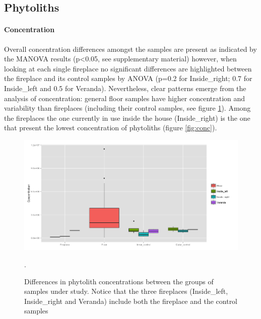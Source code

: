 \documentclass[authoryear,preprint,review,12pt]{elsarticle}
\begin{document}
\subsection{Phytoliths}
\label{subsec:3.1}
\paragraph{Concentration}
Overall concentration differences amongst the samples are present as indicated by the MANOVA results (p\textless{0.05}, see supplementary material) however, when looking at each single fireplace no significant differences are highlighted between the fireplace and its control samples by ANOVA (p=0.2 for Inside\_right; 0.7 for Inside\_left and 0.5 for Veranda). Nevertheless, clear patterns emerge from the analysis of concentration: general floor samples have higher concentration and variability than fireplaces (including their control samples, see figure \ref{fig:box}). Among the fireplaces the one currently in use inside the house (Inside\_right) is the one that present the lowest concentration of phytoliths (figure \ref{fig:conc}). 

\begin{figure}[ht!]
  \begin{center}
    \includegraphics[width=15cm]{figures/concentration_fp}
    \caption{Differences in phytolith concentrations between the groups of samples under study. Notice that the three fireplaces (Inside\_left, Inside\_right and Veranda) include both the fireplace and the control samples}.
    \label{fig:box}
  \end{center}
\end{figure}
\end{document}
